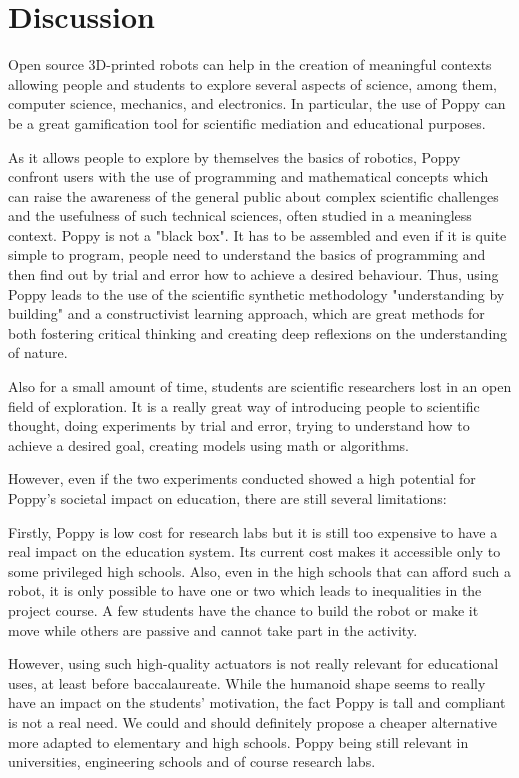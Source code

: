 \section{Discussion} %

Open source 3D-printed robots can help in the creation of meaningful contexts allowing people and students to explore several aspects of science, among them, computer science, mechanics, and electronics. In particular, the use of Poppy can be a great gamification tool for scientific mediation and educational purposes.

As it allows people to explore by themselves the basics of robotics, Poppy confront users with the use of programming and mathematical concepts which can raise the awareness of the general public about complex scientific challenges and the usefulness of such technical sciences, often studied in a meaningless context.
Poppy is not a "black box". It has to be assembled and even if it is quite simple to program, people need to understand the basics of programming and then find out by trial and error how to achieve a desired behaviour. Thus, using Poppy leads to the use of the scientific synthetic methodology "understanding by building" and a constructivist learning approach, which are great methods for both fostering critical thinking and creating deep reflexions on the understanding of nature.

Also for a small amount of time, students are scientific researchers lost in an open field of exploration. It is a really great way of introducing people to scientific thought, doing experiments by trial and error, trying to understand how to achieve a desired goal, creating models using math or algorithms.

However, even if the two experiments conducted showed a high potential for Poppy’s societal impact on education, there are still several limitations:

Firstly, Poppy is low cost for research labs but it is still too expensive to have a real impact on the education system. Its current cost makes it accessible only to some privileged high schools. Also, even in the high schools that can afford such a robot, it is only possible to have one or two which leads to inequalities in the project course. A few students have the chance to build the robot or make it move while others are passive and cannot take part in the activity.

However, using such high-quality actuators is not really relevant for educational uses, at least before baccalaureate. While the humanoid shape seems to really have an impact on the students’ motivation, the fact Poppy is tall and compliant is not a real need. We could and should definitely propose a cheaper alternative more adapted to elementary and high schools. Poppy being still relevant in universities, engineering schools and of course research labs.

